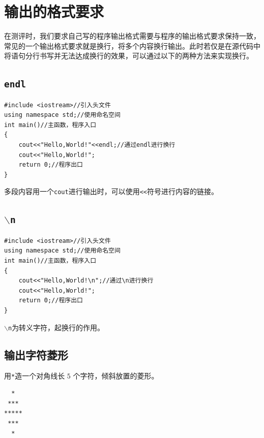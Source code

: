 \section{输出的格式要求}
在测评时，我们要求自己写的程序输出格式需要与程序的输出格式要求保持一致，常见的一个输出格式要求就是换行，将多个内容换行输出。此时若仅是在源代码中将语句分行书写并无法达成换行的效果，可以通过以下的两种方法来实现换行。
\subsection{\texttt{endl}}
\begin{verbatim}
#include <iostream>//引入头文件
using namespace std;//使用命名空间
int main()//主函数，程序入口
{
	cout<<"Hello,World!"<<endl;//通过endl进行换行
	cout<<"Hello,World!";
	return 0;//程序出口
}
\end{verbatim}
多段内容用一个\texttt{cout}进行输出时，可以使用\texttt{<<}符号进行内容的链接。
\subsection{\texttt{$\backslash$n}}
\begin{verbatim}
#include <iostream>//引入头文件
using namespace std;//使用命名空间
int main()//主函数，程序入口
{
	cout<<"Hello,World!\n";//通过\n进行换行
	cout<<"Hello,World!";
	return 0;//程序出口
}
\end{verbatim}
\texttt{$\backslash$n}为转义字符，起换行的作用。
\subsection{输出字符菱形}
用\texttt{*}造一个对角线长 $5$ 个字符，倾斜放置的菱形。
\begin{verbatim}
  *
 ***
*****
 ***
  *
\end{verbatim}

